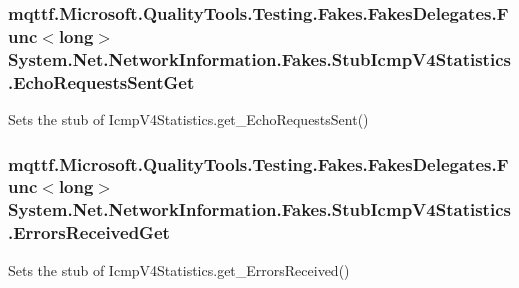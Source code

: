 \hypertarget{class_system_1_1_net_1_1_network_information_1_1_fakes_1_1_stub_icmp_v4_statistics_ad5d3625e97bd857a1757604f7eb6b3ea}{
\subsubsection[{Echo\-Requests\-Sent\-Get}]{\setlength{\rightskip}{0pt plus 5cm}mqttf.\-Microsoft.\-Quality\-Tools.\-Testing.\-Fakes.\-Fakes\-Delegates.\-Func$<$long$>$ System.\-Net.\-Network\-Information.\-Fakes.\-Stub\-Icmp\-V4\-Statistics.\-Echo\-Requests\-Sent\-Get}}\label{class_system_1_1_net_1_1_network_information_1_1_fakes_1_1_stub_icmp_v4_statistics_ad5d3625e97bd857a1757604f7eb6b3ea}


Sets the stub of Icmp\-V4\-Statistics.\-get\-\_\-\-Echo\-Requests\-Sent()

\hypertarget{class_system_1_1_net_1_1_network_information_1_1_fakes_1_1_stub_icmp_v4_statistics_aa561c68e1b5f80915971ad02e08966cd}{
\subsubsection[{Errors\-Received\-Get}]{\setlength{\rightskip}{0pt plus 5cm}mqttf.\-Microsoft.\-Quality\-Tools.\-Testing.\-Fakes.\-Fakes\-Delegates.\-Func$<$long$>$ System.\-Net.\-Network\-Information.\-Fakes.\-Stub\-Icmp\-V4\-Statistics.\-Errors\-Received\-Get}}\label{class_system_1_1_net_1_1_network_information_1_1_fakes_1_1_stub_icmp_v4_statistics_aa561c68e1b5f80915971ad02e08966cd}


Sets the stub of Icmp\-V4\-Statistics.\-get\-\_\-\-Errors\-Received()

